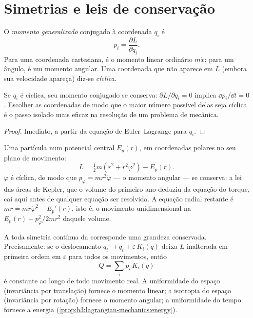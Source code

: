 \section{Simetrias e leis de conservação}

\begin{definition}\label{def:b3:lagrangian-mechanics:momentum}
O \emph{momento generalizado} conjugado à coordenada $q_i$ é
\[
p_i = \frac{\partial L}{\partial\dot q_i} .
\]
Para uma coordenada cartesiana, é o momento linear ordinário $m\dot x$;
para um ângulo, é um momento angular. Uma coordenada que não aparece em
$L$ (embora sua velocidade apareça) diz-se \emph{cíclica}.
\end{definition}

\begin{proposition}\label{prop:b3:lagrangian-mechanics:cyclic}
Se $q_i$ é cíclica, seu momento conjugado se conserva:
$\partial L/\partial q_i = 0$ implica $\dd p_i/\dd t = 0$. Escolher as
coordenadas de modo que o maior número possível delas seja cíclica é o
passo isolado mais eficaz na resolução de um problema de mecânica.
\end{proposition}

\begin{proof}
Imediato, a partir da equação de Euler--Lagrange para $q_i$.
\end{proof}

\begin{example}\label{ex:b3:lagrangian-mechanics:central}
Uma partícula num potencial central $E_p(r)$, em coordenadas polares no
seu plano de movimento:
\[
L = \tfrac12 m(\dot r^2 + r^2\dot\varphi^2) - E_p(r) .
\]
$\varphi$ é cíclica, de modo que $p_\varphi = mr^2\dot\varphi$ --- o
momento angular --- se conserva: a lei das áreas de Kepler, que o
volume do primeiro ano deduziu da equação do torque, cai aqui antes de
qualquer equação ser resolvida. A equação radial restante é
$m\ddot r = mr\dot\varphi^2 - E_p'(r)$, isto é, o movimento
unidimensional na 
$E_p(r) + p_\varphi^2/2mr^2$ daquele volume.
\end{example}

\begin{theorem}\label{thm:b3:lagrangian-mechanics:noether}
A toda simetria contínua da  corresponde uma grandeza
conservada. Precisamente: se o deslocamento
$q_i \to q_i + \varepsilon\,K_i(q)$ deixa $L$ inalterada em primeira
ordem em $\varepsilon$ para todos os movimentos, então
\[
Q = \sum_i p_i\,K_i(q)
\]
é constante ao longo de todo movimento real. A uniformidade do espaço
(invariância por translação) fornece o momento linear; a isotropia do
espaço (invariância por rotação) fornece o momento angular; a
uniformidade do tempo fornece a energia
(\cref{prop:b3:lagrangian-mechanics:energy}).
\end{theorem}

